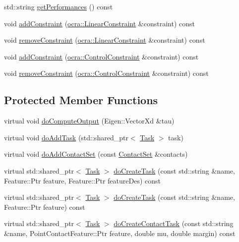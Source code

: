 \begin{DoxyCompactItemize}
\item 
std\+::string \hyperlink{classwocra_1_1WocraController_a4023613cae33e5f490babbc6d162204d}{get\+Performances} () const
\item 
void \hyperlink{classwocra_1_1WocraController_a45b43039b1d950ba59d569f24b6e265d}{add\+Constraint} (\hyperlink{namespaceocra_ae8b87cf4099be3efc3b410019ad2046e}{ocra\+::\+Linear\+Constraint} \&constraint) const
\item 
void \hyperlink{classwocra_1_1WocraController_ac1234e8084fedc0ed39e2ee97a40a31c}{remove\+Constraint} (\hyperlink{namespaceocra_ae8b87cf4099be3efc3b410019ad2046e}{ocra\+::\+Linear\+Constraint} \&constraint) const
\item 
void \hyperlink{classwocra_1_1WocraController_af6db65f470668d19bb7fd24821f042db}{add\+Constraint} (\hyperlink{classocra_1_1ControlConstraint}{ocra\+::\+Control\+Constraint} \&constraint) const
\item 
void \hyperlink{classwocra_1_1WocraController_a9a1b55fe0392b1514a813d4f9ed413b2}{remove\+Constraint} (\hyperlink{classocra_1_1ControlConstraint}{ocra\+::\+Control\+Constraint} \&constraint) const
\end{DoxyCompactItemize}
\subsection*{Protected Member Functions}
\begin{DoxyCompactItemize}
\item 
virtual void \hyperlink{classwocra_1_1WocraController_aaf750c45d062220e3f78ccb1c8a41d07}{do\+Compute\+Output} (Eigen\+::\+Vector\+Xd \&tau)
\item 
virtual void \hyperlink{classwocra_1_1WocraController_aa9a681aa5c0f043638d4d2956c2913c1}{do\+Add\+Task} (std\+::shared\+\_\+ptr$<$ \hyperlink{classocra_1_1Task}{Task} $>$ task)
\item 
virtual void \hyperlink{classwocra_1_1WocraController_a74d8fa3103ca3787add351620c5bcf73}{do\+Add\+Contact\+Set} (const \hyperlink{classocra_1_1ContactSet}{Contact\+Set} \&contacts)
\item 
virtual std\+::shared\+\_\+ptr$<$ \hyperlink{classocra_1_1Task}{Task} $>$ \hyperlink{classwocra_1_1WocraController_a4ce73b9a7b7026427e8abf44f54155af}{do\+Create\+Task} (const std\+::string \&name, Feature\+::\+Ptr feature, Feature\+::\+Ptr feature\+Des) const
\item 
virtual std\+::shared\+\_\+ptr$<$ \hyperlink{classocra_1_1Task}{Task} $>$ \hyperlink{classwocra_1_1WocraController_a1dec71e9c2fb5b2d6fab0bcd230e9c00}{do\+Create\+Task} (const std\+::string \&name, Feature\+::\+Ptr feature) const
\item 
virtual std\+::shared\+\_\+ptr$<$ \hyperlink{classocra_1_1Task}{Task} $>$ \hyperlink{classwocra_1_1WocraController_a60caf0250523856f915785efde7d2368}{do\+Create\+Contact\+Task} (const std\+::string \&name, Point\+Contact\+Feature\+::\+Ptr feature, double mu, double margin) const
\end{DoxyCompactItemize}
